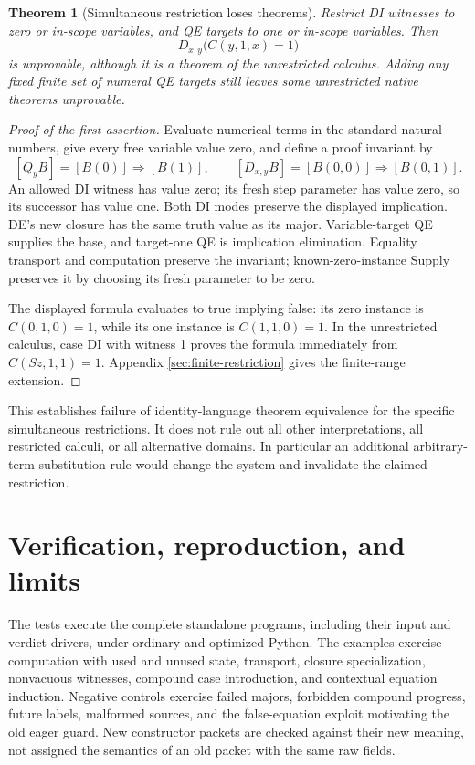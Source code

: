 \documentclass[11pt,letterpaper]{article}
\newtheorem{theorem}{Theorem}[section]
\theoremstyle{definition}\newtheorem{definition}[theorem]{Definition}
\theoremstyle{remark}\newtheorem{remark}[theorem]{Remark}
\begin{document}
\begin{theorem}[Simultaneous restriction loses theorems]
Restrict DI witnesses to zero or in-scope variables, and QE targets to
one or in-scope variables. Then
\[
                 D_{x,y}\bigl(C(y,1,x)=1\bigr)
\]
is unprovable, although it is a theorem of the unrestricted calculus.
Adding any fixed finite set of numeral QE targets still leaves some
unrestricted native theorems unprovable.
\end{theorem}
\begin{proof}[Proof of the first assertion]
Evaluate numerical terms in the standard natural numbers, give every
free variable value zero, and define a proof invariant by
\[
 [Q_yB]=[B(0)]\Rightarrow[B(1)],\qquad
 [D_{x,y}B]=[B(0,0)]\Rightarrow[B(0,1)].
\]
An allowed DI witness has value zero; its fresh step parameter has value
zero, so its successor has value one. Both DI modes preserve the
displayed implication. DE's new closure has the same truth value as
its major. Variable-target QE supplies the base, and target-one QE is
implication elimination. Equality transport and computation preserve
the invariant; known-zero-instance Supply preserves it by choosing its
fresh parameter to be zero.

The displayed formula evaluates to true implying false: its zero
instance is $C(0,1,0)=1$, while its one instance is $C(1,1,0)=1$.
In the unrestricted calculus, case DI with witness 1 proves the formula
immediately from $C(Sz,1,1)=1$. Appendix
\ref{sec:finite-restriction} gives the finite-range extension.
\end{proof}

This establishes failure of identity-language theorem equivalence for
the specific simultaneous restrictions. It does not rule out all other
interpretations, all restricted calculi, or all alternative domains. In
particular an additional arbitrary-term substitution rule would change
the system and invalidate the claimed restriction.

\section{Verification, reproduction, and limits}
\label{sec:evidence}



The tests execute the complete standalone programs, including their
input and verdict drivers, under ordinary and optimized Python. The
examples exercise computation with used and unused state, transport,
closure specialization, nonvacuous witnesses, compound case introduction,
and contextual equation induction. Negative controls exercise failed
majors, forbidden compound progress, future labels, malformed sources,
and the false-equation exploit motivating the old eager guard. New
constructor packets are checked against their new meaning, not assigned
the semantics of an old packet with the same raw fields.
\end{document}
